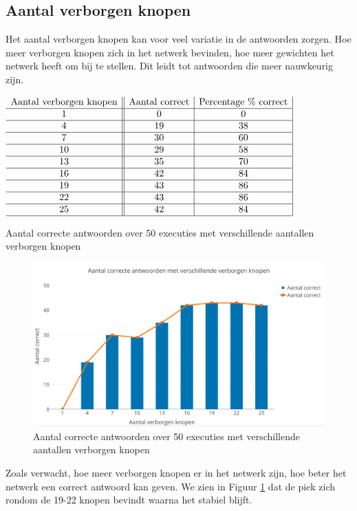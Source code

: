 \subsection{Aantal verborgen knopen}
Het aantal verborgen knopen kan voor veel variatie in de antwoorden zorgen. Hoe meer verborgen knopen zich in het netwerk bevinden, hoe meer gewichten het netwerk heeft om bij te stellen. Dit leidt tot antwoorden die meer nauwkeurig zijn.

\begin{table}[ht]
    \centering
      $\begin{array}{c||c|c |}
        \text{Aantal verborgen knopen} & \text{Aantal correct} & \text{Percentage \% correct} \\ \hline
        1 & 0 & 0 \\ \hline
        4 & 19 & 38 \\ \hline
        7 & 30 & 60 \\ \hline
        10 & 29 & 58 \\ \hline
        13 & 35 & 70 \\ \hline
        16 & 42 & 84 \\ \hline
        19 & 43 & 86 \\ \hline
        22 & 43 & 86 \\ \hline
        25 & 42 & 84 \\ \hline
      \end{array}$
    \caption{Aantal correcte antwoorden over 50 executies met verschillende aantallen verborgen knopen}
    \label{tab:hidden}
\end{table}

\begin{figure}[ht]
    \centering
    \includegraphics[scale=0.3]{graphs/knopen.png}
    \caption{Aantal correcte antwoorden over 50 executies met verschillende aantallen verborgen knopen}
    \label{fig:hidden}
\end{figure}

Zoals verwacht, hoe meer verborgen knopen er in het netwerk zijn, hoe beter het netwerk een correct antwoord kan geven. We zien in Figuur \ref{fig:hidden} dat de piek zich rondom de 19-22 knopen bevindt waarna het stabiel blijft. 
